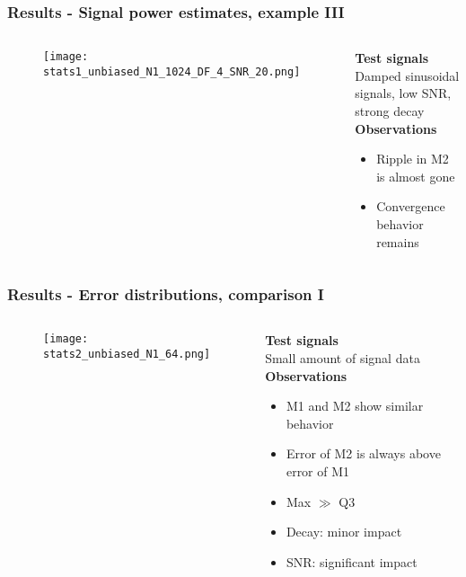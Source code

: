 \documentclass[11pt,aspectratio=169]{beamer}
\begin{document}
	\begin{frame}
		\frametitle{Results - Signal power estimates, example III}
		\begin{columns}[t]
			\begin{RIPcolleft}
				\begin{figure}
					\texttt{[image: stats1\_unbiased\_N1\_1024\_DF\_4\_SNR\_20.png]}
				\end{figure}
			\end{RIPcolleft}
			\begin{RIPcolright}
				\textbf{Test signals}\\
				Damped sinusoidal signals, low SNR, strong decay\\
				\vspace*{.5em}
				\textbf{Observations}\\
				\begin{itemize}
					\item Ripple in M2 is almost gone
					\item Convergence behavior remains
				\end{itemize}
			\end{RIPcolright}
		\end{columns}
	\end{frame}
	\begin{frame}
		\frametitle{Results - Error distributions, comparison I}
		\begin{columns}[t]
			\begin{RIPcolleft}
				\begin{figure}
					\texttt{[image: stats2\_unbiased\_N1\_64.png]}
				\end{figure}
			\end{RIPcolleft}
			\begin{RIPcolright}
				\textbf{Test signals}\\
				Small amount of signal data\\
				\vspace*{.5em}
				\textbf{Observations}\\
				\begin{itemize}
					\item M1 and M2 show similar behavior
					\item Error of M2 is always above error of M1
					\item Max $\gg$ Q3
					\item Decay: minor impact
					\item SNR: significant impact
				\end{itemize}
			\end{RIPcolright}
		\end{columns}
	\end{frame}
\end{document}
